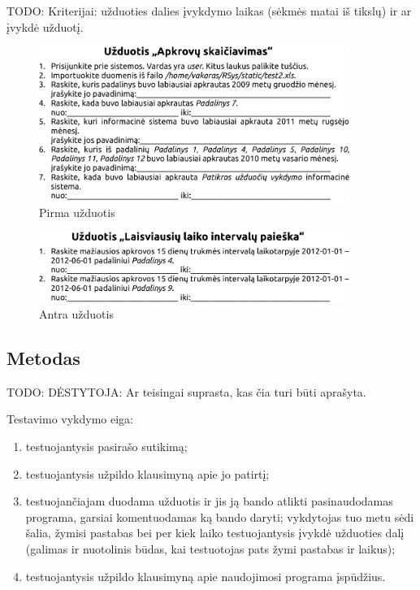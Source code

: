 TODO: Kriterijai: užduoties dalies įvykdymo laikas (sėkmės matai iš
tikslų) ir ar įvykdė užduotį.

\begin{figure}[H]
  \begin{center}
    \includegraphics[width=0.9\textwidth]{./4/pdfs/uzduotis1.pdf}
  \end{center}
  \caption{Pirma užduotis}
  \label{fig:uzduotis_1}
\end{figure}

\begin{figure}[H]
  \begin{center}
    \includegraphics[width=0.9\textwidth]{./4/pdfs/uzduotis2.pdf}
  \end{center}
  \caption{Antra užduotis}
  \label{fig:uzduotis_2}
\end{figure}

\subsection{Metodas}

TODO: DĖSTYTOJA: Ar teisingai suprasta, kas čia turi būti aprašyta.

Testavimo vykdymo eiga:
\begin{enumerate}
  \item testuojantysis pasirašo sutikimą;
  \item testuojantysis užpildo klausimyną apie jo patirtį;
  \item testuojančiajam duodama užduotis ir jis ją bando atlikti
    pasinaudodamas programa, garsiai komentuodamas ką bando daryti;
    vykdytojas tuo metu sėdi šalia, žymisi pastabas bei per kiek
    laiko testuojantysis įvykdė užduoties dalį (galimas ir nuotolinis
    būdas, kai testuotojas pats žymi pastabas ir laikus);
  \item testuojantysis užpildo klausimyną apie naudojimosi programa
    įspūdžius.
\end{enumerate}


